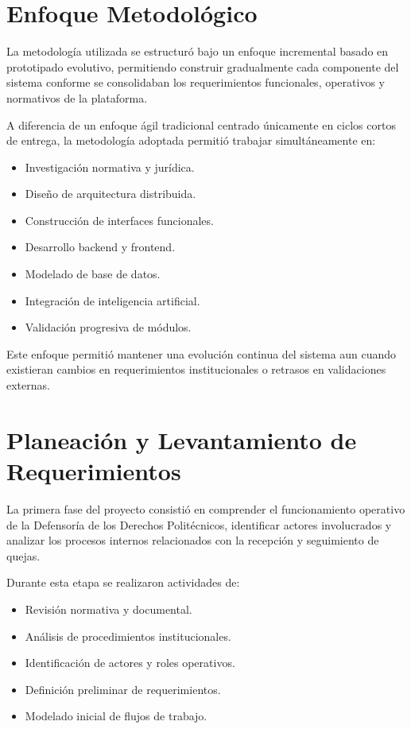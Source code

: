 \section{Enfoque Metodológico}

La metodología utilizada se estructuró bajo un enfoque incremental basado en prototipado evolutivo, permitiendo construir gradualmente cada componente del sistema conforme se consolidaban los requerimientos funcionales, operativos y normativos de la plataforma.

A diferencia de un enfoque ágil tradicional centrado únicamente en ciclos cortos de entrega, la metodología adoptada permitió trabajar simultáneamente en:

\begin{itemize}
    \item Investigación normativa y jurídica.
    \item Diseño de arquitectura distribuida.
    \item Construcción de interfaces funcionales.
    \item Desarrollo backend y frontend.
    \item Modelado de base de datos.
    \item Integración de inteligencia artificial.
    \item Validación progresiva de módulos.
\end{itemize}

Este enfoque permitió mantener una evolución continua del sistema aun cuando existieran cambios en requerimientos institucionales o retrasos en validaciones externas.

\section{Planeación y Levantamiento de Requerimientos}

La primera fase del proyecto consistió en comprender el funcionamiento operativo de la Defensoría de los Derechos Politécnicos, identificar actores involucrados y analizar los procesos internos relacionados con la recepción y seguimiento de quejas.

Durante esta etapa se realizaron actividades de:

\begin{itemize}
    \item Revisión normativa y documental.
    \item Análisis de procedimientos institucionales.
    \item Identificación de actores y roles operativos.
    \item Definición preliminar de requerimientos.
    \item Modelado inicial de flujos de trabajo.
\end{itemize}

